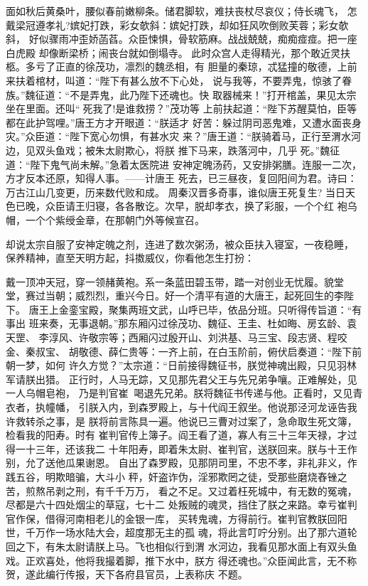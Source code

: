 面如秋后黄桑叶，腰似春前嫩柳条。储君脚软，难扶丧杖尽哀仪；侍长魂飞，
怎戴梁冠遵孝礼?嫔妃打跌，彩女欹斜：嫔妃打跌，却如狂风吹倒败芙蓉；彩女欹斜，
好似骤雨冲歪娇菡萏。众臣悚惧，骨软筋麻。战战兢兢，痴痴痖痖。把一座白虎殿
却像断梁桥；闹丧台就如倒塌寺。
此时众宫人走得精光，那个敢近灵扶柩。多亏了正直的徐茂功，凛烈的魏丞相，有
胆量的秦琼，忒猛撞的敬德，上前来扶着棺材，叫道：“陛下有甚么放不下心处，
说与我等，不要弄鬼，惊骇了眷族。”魏征道：“不是弄鬼，此乃陛下还魂也。快
取器械来！”打开棺盖，果见太宗坐在里面。还叫“死我了!是谁救捞？”茂功等
上前扶起道：“陛下苏醒莫怕，臣等都在此护驾哩。”唐王方才开眼道：“朕适才
好苦：躲过阴司恶鬼难，又遭水面丧身灾。”众臣道：“陛下宽心勿惧，有甚水灾
来？”唐王道：“朕骑着马，正行至渭水河边，见双头鱼戏；被朱太尉欺心，将朕
推下马来，跌落河中，几乎死。”魏征道：“陛下鬼气尚未解。”急着太医院进
安神定魄汤药，又安排粥膳。连服一二次，方才反本还原，知得人事。——计唐王
死去，已三昼夜，复回阳间为君。诗曰：
万古江山几变更，历来数代败和成。
周秦汉晋多奇事，谁似唐王死复生?
当日天色已晚，众臣请王归寝，各各散讫。次早，脱却孝衣，换了彩服，一个个红
袍乌帽，一个个紫绶金章，在那朝门外等候宣召。

却说太宗自服了安神定魄之剂，连进了数次粥汤，被众臣扶入寝室，一夜稳睡，
保养精神，直至天明方起，抖擞威仪，你看他怎生打扮：

戴一顶冲天冠，穿一领赭黄袍。系一条蓝田碧玉带，踏一对创业无忧履。貌堂
堂，赛过当朝；威烈烈，重兴今日。好一个清平有道的大唐王，起死回生的李陛下。
唐王上金銮宝殿，聚集两班文武，山呼已毕，依品分班。只听得传旨道：“有事出
班来奏，无事退朝。”那东厢闪过徐茂功、魏征、王圭、杜如晦、房玄龄、袁天罡、
李淳风、许敬宗等；西厢闪过殷开山、刘洪基、马三宝、段志贤、程咬金、秦叔宝、
胡敬德、薛仁贵等：一齐上前，在白玉阶前，俯伏启奏道：“陛下前朝一梦，如何
许久方觉？”太宗道：“日前接得魏征书，朕觉神魂出殿，只见羽林军请朕出猎。
正行时，人马无踪，又见那先君父王与先兄弟争嚷。正难解处，见一人乌帽皂袍，
乃是判官崔，喝退先兄弟。朕将魏征书传递与他。正看时，又见青衣者，执幢幡，
引朕入内，到森罗殿上，与十代阎王叙坐。他说那泾河龙诬告我许救转杀之事，是
朕将前言陈具一遍。他说已三曹对过案了，急命取生死文簿，检看我的阳寿。时有
崔判官传上簿子。阎王看了道，寡人有三十三年天禄，才过得一十三年，还该我二
十年阳寿，即着朱太尉、崔判官，送朕回来。朕与十王作别，允了送他瓜果谢恩。
自出了森罗殿，见那阴司里，不忠不孝，非礼非义，作践五谷，明欺暗骗，大斗小
秤，奸盗诈伪，淫邪欺罔之徒，受那些磨烧舂锉之苦，煎熬吊剥之刑，有千千万万，
看之不足。又过着枉死城中，有无数的冤魂，尽都是六十四处烟尘的草寇，七十二
处叛贼的魂灵，挡住了朕之来路。幸亏崔判官作保，借得河南相老儿的金银一库，
买转鬼魂，方得前行。崔判官教朕回阳世，千万作一场水陆大会，超度那无主的孤
魂，将此言叮咛分别。出了那六道轮回之下，有朱太尉请朕上马。飞也相似行到渭
水河边，我看见那水面上有双头鱼戏。正欢喜处，他将我撮着脚，推下水中，朕方
得还魂也。”众臣闻此言，无不称贺，遂此编行传报，天下各府县官员，上表称庆
不题。

